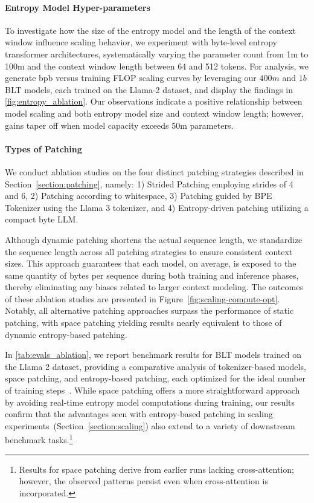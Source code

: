 \paragraph{Entropy Model Hyper-parameters} To investigate how the size of the entropy model and the length of the context window influence scaling behavior, we experiment with byte-level entropy transformer architectures, systematically varying the parameter count from 1m to 100m and the context window length between 64 and 512 tokens. For analysis, we generate bpb versus training FLOP scaling curves by leveraging our $400m$ and $1b$ {\textsc BLT} models, each trained on the Llama-2 dataset, and display the findings in \autoref{fig:entropy_ablation}. Our observations indicate a positive relationship between model scaling and both entropy model size and context window length; however, gains taper off when model capacity exceeds 50m parameters.

\paragraph{Types of Patching}

We conduct ablation studies on the four distinct patching strategies described in Section~\ref{section:patching}, namely: 1) Strided Patching employing strides of 4 and 6, 2) Patching according to whitespace, 3) Patching guided by BPE Tokenizer using the Llama 3 tokenizer, and 4) Entropy-driven patching utilizing a compact byte LLM.

Although dynamic patching shortens the actual sequence length, we standardize the sequence length across all patching strategies to ensure consistent context sizes. This approach guarantees that each model, on average, is exposed to the same quantity of bytes per sequence during both training and inference phases, thereby eliminating any biases related to larger context modeling. The outcomes of these ablation studies are presented in Figure~\ref{fig:scaling-compute-opt}. Notably, all alternative patching approaches surpass the performance of static patching, with space patching yielding results nearly equivalent to those of dynamic entropy-based patching.

In \autoref{tab:evals_ablation}, we report benchmark results for {\textsc BLT} models trained on the Llama 2 dataset, providing a comparative analysis of tokenizer-based models, space patching, and entropy-based patching, each optimized for the ideal number of training steps~\citep{dubey2024llama}. While space patching offers a more straightforward approach by avoiding real-time entropy model computations during training, our results confirm that the advantages seen with entropy-based patching in scaling experiments~(Section~\ref{section:scaling}) also extend to a variety of downstream benchmark tasks.\footnote{Results for space patching derive from earlier runs lacking cross-attention; however, the observed patterns persist even when cross-attention is incorporated.}

